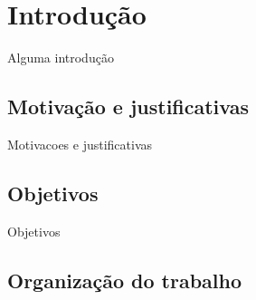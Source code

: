 \chapter{Introdução}

Alguma introdução

\section{Motivação e justificativas}

Motivacoes e justificativas

\section{Objetivos}

Objetivos

\section{Organização do trabalho}